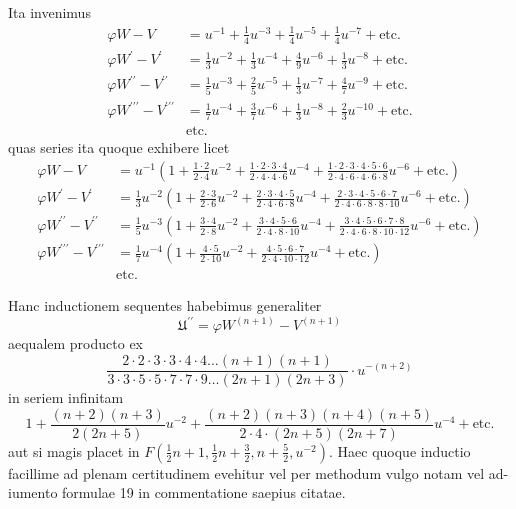 \documentclass[12pt,a4paper]{article}
\newcommand{\UU}{\mathfrak{U}}
\begin{document}
Ita invenimus
\begin{align*}
\varphi W - V &= u^{-1} + \tfrac{1}{4}u^{-3} + \tfrac{1}{4}u^{-5} + \tfrac{1}{4}u^{-7} + \text{etc.}\\
\varphi W^\prime - V^\prime &= \tfrac{1}{3}u^{-2} + \tfrac{1}{3}u^{-4} + \tfrac{4}{9}u^{-6} + \tfrac{1}{3}u^{-8} + \text{etc.}\\
\varphi W^{\prime\prime} - V^{\prime\prime} &= \tfrac{1}{5}u^{-3} + \tfrac{2}{5}u^{-5} + \tfrac{1}{3}u^{-7} + \tfrac{4}{7}u^{-9} + \text{etc.}\\
\varphi W^{\prime\prime\prime} - V^{\prime\prime\prime} &= \tfrac{1}{7}u^{-4} + \tfrac{3}{7}u^{-6} + \tfrac{1}{3}u^{-8} + \tfrac{2}{3}u^{-10} + \text{etc.}\\
&\text{etc.}
\end{align*}
quas series ita quoque exhibere licet
\begin{align*}
\varphi W - V &= u^{-1}\left(1 + \tfrac{1 \cdot 2}{2 \cdot 4}u^{-2} + \tfrac{1 \cdot 2 \cdot 3 \cdot 4}{2 \cdot 4 \cdot 4 \cdot 6}u^{-4} + \tfrac{1 \cdot 2 \cdot 3 \cdot 4 \cdot 5 \cdot 6}{2 \cdot 4 \cdot 6 \cdot 4 \cdot 6 \cdot 8}u^{-6} + \text{etc.}\right)\\
\varphi W^\prime - V^\prime &= \tfrac{1}{3}u^{-2}\left(1 + \tfrac{2 \cdot 3}{2 \cdot 6}u^{-2} + \tfrac{2 \cdot 3 \cdot 4 \cdot 5}{2 \cdot 4 \cdot 6 \cdot 8}u^{-4} + \tfrac{2 \cdot 3 \cdot 4 \cdot 5 \cdot 6 \cdot 7}{2 \cdot 4 \cdot 6 \cdot 8 \cdot 8 \cdot 10}u^{-6} + \text{etc.}\right)\\
\varphi W^{\prime\prime} - V^{\prime\prime} &= \tfrac{1}{5}u^{-3}\left(1 + \tfrac{3 \cdot 4}{2 \cdot 8}u^{-2} + \tfrac{3 \cdot 4 \cdot 5 \cdot 6}{2 \cdot 4 \cdot 8 \cdot 10}u^{-4} + \tfrac{3 \cdot 4 \cdot 5 \cdot 6 \cdot 7 \cdot 8}{2 \cdot 4 \cdot 6 \cdot 8 \cdot 10 \cdot 12}u^{-6} + \text{etc.}\right)\\
\varphi W^{\prime\prime\prime} - V^{\prime\prime\prime} &= \tfrac{1}{7}u^{-4}\left(1 + \tfrac{4 \cdot 5}{2 \cdot 10}u^{-2} + \tfrac{4 \cdot 5 \cdot 6 \cdot 7}{2 \cdot 4 \cdot 10 \cdot 12}u^{-4} + \text{etc.}\right)\\
&\text{etc.}
\end{align*}

Hanc inductionem sequentes habebimus generaliter
\[
\UU^{\prime\prime} = \varphi W^{(n+1)} - V^{(n+1)}
\]
aequalem producto ex
\[
\frac{2 \cdot 2 \cdot 3 \cdot 3 \cdot 4 \cdot 4 \ldots (n+1)(n+1)}{3 \cdot 3 \cdot 5 \cdot 5 \cdot 7 \cdot 7 \cdot 9 \ldots (2n+1)(2n+3)} \cdot u^{-(n+2)}
\]
in seriem infinitam
\[
1 + \frac{(n+2)(n+3)}{2(2n+5)} u^{-2} + \frac{(n+2)(n+3)(n+4)(n+5)}{2 \cdot 4 \cdot (2n+5)(2n+7)} u^{-4} + \text{etc.}
\]
aut si magis placet in $F(\tfrac{1}{2}n+1, \tfrac{1}{2}n+\tfrac{3}{2}, n+\tfrac{5}{2}, u^{-2})$. Haec quoque inductio
facillime ad plenam certitudinem evehitur vel per methodum vulgo notam vel ad-
iumento formulae 19 in commentatione saepius citatae.
\end{document}
